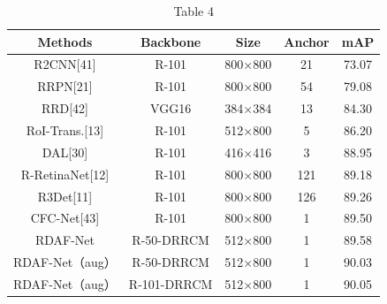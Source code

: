 \documentclass[10pt,twocolumn,final]{article}
\begin{document}
\begin{table}[tbp]
\centering
\begin{tabular}{c c c c c}
\toprule
\textbf{Methods} & \textbf{Backbone} & \textbf{Size} & \textbf{Anchor} & \textbf{mAP} \\
\midrule
R2CNN[41] & R-101 & 800×800 & 21 & 73.07 \\
RRPN[21] & R-101 & 800×800 & 54 & 79.08 \\
RRD[42] & VGG16 & 384×384 & 13 & 84.30 \\
RoI-Trans.[13] & R-101 & 512×800 & 5 & 86.20 \\
DAL[30] & R-101 & 416×416 & 3 & 88.95 \\
R-RetinaNet[12] & R-101 & 800×800 & 121 & 89.18 \\
R3Det[11] & R-101 & 800×800 & 126 & 89.26 \\
CFC-Net[43] & R-101 & 800×800 & 1 & 89.50 \\
RDAF-Net & R-50-DRRCM & 512×800 & 1 & 89.58 \\
RDAF-Net（aug） & R-50-DRRCM & 512×800 & 1 & 90.03 \\
RDAF-Net（aug） & R-101-DRRCM & 512×800 & 1 & 90.05 \\
\bottomrule
\end{tabular}
\caption{Table 4}
\label{tab:tbl_4}
\end{table}
\end{document}
